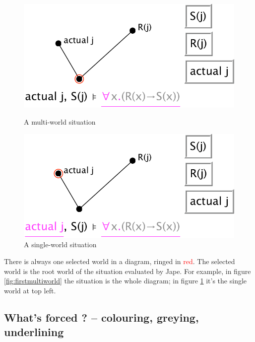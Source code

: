 \documentclass[11pt]{book}
\newcommand{\figref}[1]{figure \ref{fig:#1}}
\begin{document}
\begin{figure}
\centering
\parbox{200pt}{\centering
\includegraphics[scale=0.5]{pics/firstmultiworld}
\caption{A multi-world situation}
\label{fig:firstmultiworld}
}
\qquad
\parbox{200pt}{\centering
\includegraphics[scale=0.5]{pics/parvainmultum}
\caption{A single-world situation}
\label{fig:parvainmultum}
}
\end{figure}

There is always one selected world in a diagram, ringed in \textcolor{red}{red}. The selected world is the root world of the situation evaluated by Jape. For example, in \figref{firstmultiworld} the situation is the whole diagram; in \figref{parvainmultum} it's the single world at top left.

\subsection{What's forced ? -- colouring, greying, underlining}
\end{document}
